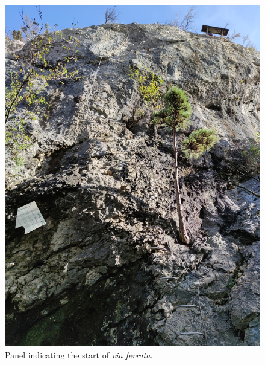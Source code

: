 \begin{figure}[!ht]
	\centering%
	\includegraphics[width=\columnwidth, clip]{media/pictures/via-ferrata-les-prises-de-la-bastille-4}
	\caption{\label{fig:via-ferrata-les-prises-de-la-bastille-4}Panel indicating the start of \emph{via ferrata}.}
\end{figure}

